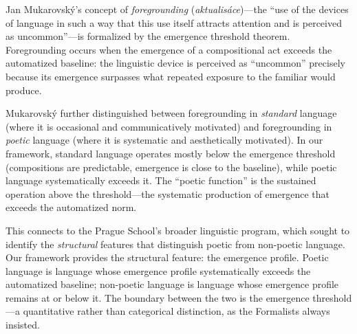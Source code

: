 \begin{interpretation}
\label{interp:mukarovsky}
Jan Mukarovsk\'y's concept of \emph{foregrounding} (\emph{aktualis\'ace})---the ``use of the devices of language in such a way that this use itself attracts attention and is perceived as uncommon''---is formalized by the emergence threshold theorem.  Foregrounding occurs when the emergence of a compositional act exceeds the automatized baseline: the linguistic device is perceived as ``uncommon'' precisely because its emergence surpasses what repeated exposure to the familiar would produce.

Mukarovsk\'y further distinguished between foregrounding in \emph{standard} language (where it is occasional and communicatively motivated) and foregrounding in \emph{poetic} language (where it is systematic and aesthetically motivated).  In our framework, standard language operates mostly below the emergence threshold (compositions are predictable, emergence is close to the baseline), while poetic language systematically exceeds it.  The ``poetic function'' is the sustained operation above the threshold---the systematic production of emergence that exceeds the automatized norm.

This connects to the Prague School's broader linguistic program, which sought to identify the \emph{structural} features that distinguish poetic from non-poetic language.  Our framework provides the structural feature: the emergence profile.  Poetic language is language whose emergence profile systematically exceeds the automatized baseline; non-poetic language is language whose emergence profile remains at or below it.  The boundary between the two is the emergence threshold---a quantitative rather than categorical distinction, as the Formalists always insisted.
\end{interpretation}

